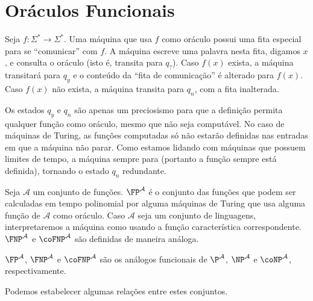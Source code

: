 \section{Oráculos Funcionais}

\begin{definition}
    Seja $f : \Sigma^* \rightarrow \Sigma^*$.
    Uma máquina que usa $f$ como oráculo
    possui uma fita especial para se ``comunicar'' com $f$.
    A máquina escreve uma palavra nesta fita,
    digamos $x$,
    e consulta o oráculo
    (isto é, transita para $q_?$).
    Caso $f(x)$ exista,
    a máquina transitará para $q_y$
    e o conteúdo da ``fita de comunicação'' é alterado para $f(x)$.
    Caso $f(x)$ não exista,
    a máquina transita para $q_n$,
    com a fita inalterada.
\end{definition}

Os estados $q_y$ e $q_n$ são apenas um preciosismo
para que a definição permita qualquer função como oráculo,
mesmo que não seja computável.
No caso de máquinas de Turing,
as funções computadas só não estarão definidas
nas entradas em que a máquina não parar.
Como estamos lidando com máquinas que possuem limites de tempo,
a máquina sempre para
(portanto a função sempre está definida),
tornando o estado $q_n$ redundante.

\begin{definition}
    Seja $\mathcal A$ um conjunto de funções.
    $\FP^\mathcal A$ é o conjunto das funções
    que podem ser calculadas em tempo polinomial
    por alguma máquinas de Turing que usa alguma função de $\mathcal A$ como oráculo.
    Caso $\mathcal A$ seja um conjunto de linguagens,
    interpretaremos a máquina como usando a função característica correspondente.
    $\FNP^\mathcal A$ e $\coFNP^\mathcal A$
    são definidas de maneira análoga.
\end{definition}

$\FP^\mathcal A$, $\FNP^\mathcal A$ e $\coFNP^\mathcal A$
são os análogos funcionais de
$\P^\mathcal A$, $\NP^\mathcal A$ e $\coNP^\mathcal A$,
respectivamente.

Podemos estabelecer algumas relações entre estes conjuntos.

